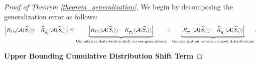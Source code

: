 \begin{proof}[Proof of Theorem \ref{theorem_generalization}]
We begin by decomposing the generalization error as follows:
\begin{align}
\left|R_{\mathcal{D}_0}(\mathcal{A}(\widetilde{S}_i))-\widehat{R}_{\widetilde{S}_i}(\mathcal{A}(\widetilde{S}_i))\right| \leq \underbrace{\left|R_{\mathcal{D}_0}(\mathcal{A}(\widetilde{S}_i))-R_{\widetilde{\mathcal{D}}_i}(\mathcal{A}(\widetilde{S}_i))\right|}_{\text {Cumulative distribution shift across generations}}+\underbrace{\left| R_{\widetilde{\mathcal{D}}_i}(\mathcal{A}(\widetilde{S}_i))-\widehat{R}_{\widetilde{S}_i}(\mathcal{A}(\widetilde{S}_i)) \right|}_{\text {Generalization error on mixed distributions}}. \notag
\end{align}


\textbf{Upper Bounding Cumulative Distribution Shift Term}



\end{proof}
